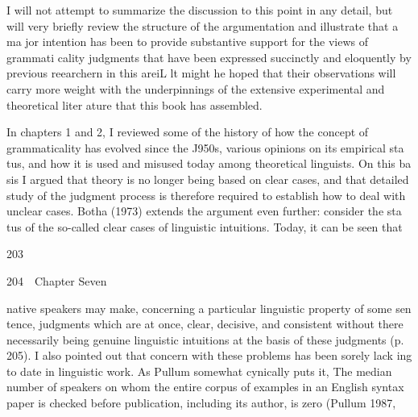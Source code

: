 \begin{styleStandard}
I will not attempt to summarize the discussion to this point in any detail, but will very briefly review the structure of the argumentation and illustrate that a ma\- jor intention has been to provide substantive support for the views of grammati\- cality judgments that have been expressed succinctly and eloquently by previous reearchern in this areiL lt might he hoped that their observations will carry more weight with the underpinnings of the extensive experimental and theoretical liter\- ature that this book has assembled.
\end{styleStandard}


\begin{styleStandard}
In chapters 1 and 2, I reviewed some of the history of how the concept of grammaticality has evolved since the J950s, various opinions on its empirical sta\- tus, and how it is used and misused today among theoretical linguists. On this ba\- sis I argued that theory is no longer being based on clear cases, and that detailed study of the judgment process is therefore required to establish how to deal with unclear cases. Botha (1973) extends the argument even further: {\textquotedbl}consider the sta\- tus of the so-called clear cases of linguistic intuitions. Today, it can be seen that
\end{styleStandard}


\begin{styleStandard}
203
\end{styleStandard}


\clearpage\setcounter{page}{1}\begin{styleStandard}
204\ \ Chapter Seven
\end{styleStandard}


\begin{styleTextbody}
native speakers may make, concerning a particular linguistic property of some sen\- tence, judgments which are at once, clear, decisive, and consistent without there necessarily being genuine linguistic intuitions at the basis of these judgments{\textquotedbl} (p. 205). I also pointed out that concern with these problems has been sorely lack\- ing to date in linguistic work. As Pullum somewhat cynically puts it, {\textquotedbl}The median number of speakers on whom the entire corpus of examples in an English syntax paper is checked before publication, including its author, is zero{\textquotedbl} (Pullum 1987,
\end{styleTextbody}



